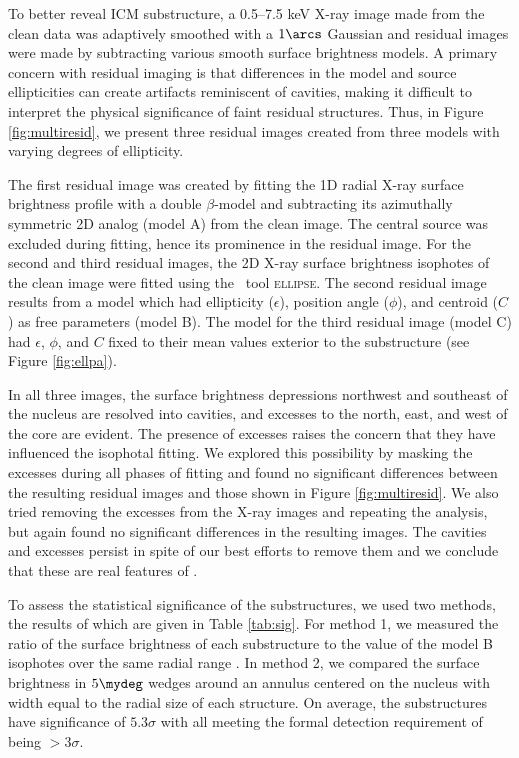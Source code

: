\documentclass[useAMS,usenatbib]{mn2e}
\begin{document}
To better reveal ICM substructure, a 0.5--7.5 keV X-ray image made
from the clean data was adaptively smoothed with a $1\arcs$ Gaussian
and residual images were made by subtracting various smooth surface
brightness models. A primary concern with residual imaging is that
differences in the model and source ellipticities can create artifacts
reminiscent of cavities, making it difficult to interpret the physical
significance of faint residual structures. Thus, in Figure
\ref{fig:multiresid}, we present three residual images created from
three models with varying degrees of ellipticity.

The first residual image was created by fitting the 1D radial X-ray
surface brightness profile with a double $\beta$-model
\citep{betamodel} and subtracting its azimuthally symmetric 2D analog
(model A) from the clean image. The central source was excluded during
fitting, hence its prominence in the residual image. For the second
and third residual images, the 2D X-ray surface brightness isophotes
of the clean image were fitted using the \iraf\ tool
\textsc{ellipse}. The second residual image results from a model which
had ellipticity ($\epsilon$), position angle ($\phi$), and centroid
($C$) as free parameters (model B). The model for the third residual
image (model C) had $\epsilon$, $\phi$, and $C$ fixed to their mean
values exterior to the substructure (see Figure \ref{fig:ellpa}).

In all three images, the surface brightness depressions northwest and
southeast of the nucleus are resolved into cavities, and excesses to
the north, east, and west of the core are evident. The presence of
excesses raises the concern that they have influenced the isophotal
fitting. We explored this possibility by masking the excesses during
all phases of fitting and found no significant differences between the
resulting residual images and those shown in Figure
\ref{fig:multiresid}. We also tried removing the excesses from the
X-ray images and repeating the analysis, but again found no
significant differences in the resulting images. The cavities and
excesses persist in spite of our best efforts to remove them and we
conclude that these are real features of \irs.

To assess the statistical significance of the substructures, we used
two methods, the results of which are given in Table
\ref{tab:sig}. For method 1, we measured the ratio of the surface
brightness of each substructure to the value of the model B isophotes
over the same radial range \citep[see][for a similar
  approach]{hydraa}. In method 2, we compared the surface brightness
in $5\mydeg$ wedges around an annulus centered on the nucleus with
width equal to the radial size of each structure. On average, the
substructures have significance of $5.3\sigma$ with all meeting the
formal detection requirement of being $>3\sigma$.
\end{document}
